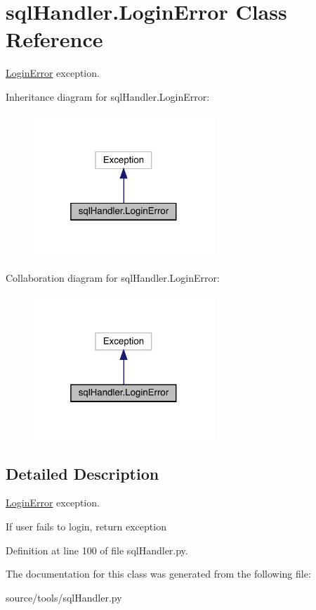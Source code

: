 \hypertarget{classsql_handler_1_1_login_error}{}\section{sql\+Handler.\+Login\+Error Class Reference}
\label{classsql_handler_1_1_login_error}


\mbox{\hyperlink{classsql_handler_1_1_login_error}{Login\+Error}} exception.  




Inheritance diagram for sql\+Handler.\+Login\+Error\+:\nopagebreak
\begin{figure}[H]
\begin{center}
\leavevmode
\includegraphics[width=193pt]{classsql_handler_1_1_login_error__inherit__graph}
\end{center}
\end{figure}


Collaboration diagram for sql\+Handler.\+Login\+Error\+:\nopagebreak
\begin{figure}[H]
\begin{center}
\leavevmode
\includegraphics[width=193pt]{classsql_handler_1_1_login_error__coll__graph}
\end{center}
\end{figure}


\subsection{Detailed Description}
\mbox{\hyperlink{classsql_handler_1_1_login_error}{Login\+Error}} exception. 

If user fails to login, return exception 

Definition at line 100 of file sql\+Handler.\+py.



The documentation for this class was generated from the following file\+:\begin{DoxyCompactItemize}
\item 
source/tools/sql\+Handler.\+py\end{DoxyCompactItemize}
